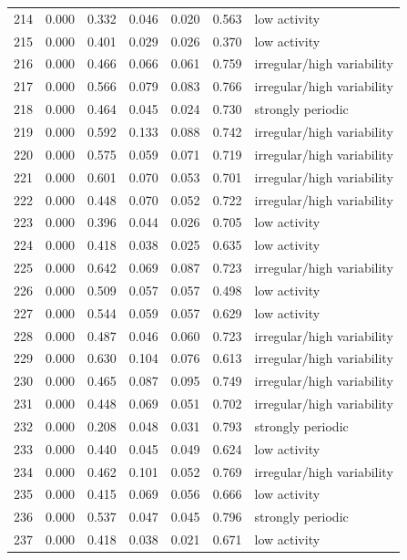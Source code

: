 \begin{longtable}{lrrrrrl}
214 & 0.000 & 0.332 & 0.046 & 0.020 & 0.563 & low activity \\
215 & 0.000 & 0.401 & 0.029 & 0.026 & 0.370 & low activity \\
216 & 0.000 & 0.466 & 0.066 & 0.061 & 0.759 & irregular/high variability \\
217 & 0.000 & 0.566 & 0.079 & 0.083 & 0.766 & irregular/high variability \\
218 & 0.000 & 0.464 & 0.045 & 0.024 & 0.730 & strongly periodic \\
219 & 0.000 & 0.592 & 0.133 & 0.088 & 0.742 & irregular/high variability \\
220 & 0.000 & 0.575 & 0.059 & 0.071 & 0.719 & irregular/high variability \\
221 & 0.000 & 0.601 & 0.070 & 0.053 & 0.701 & irregular/high variability \\
222 & 0.000 & 0.448 & 0.070 & 0.052 & 0.722 & irregular/high variability \\
223 & 0.000 & 0.396 & 0.044 & 0.026 & 0.705 & low activity \\
224 & 0.000 & 0.418 & 0.038 & 0.025 & 0.635 & low activity \\
225 & 0.000 & 0.642 & 0.069 & 0.087 & 0.723 & irregular/high variability \\
226 & 0.000 & 0.509 & 0.057 & 0.057 & 0.498 & low activity \\
227 & 0.000 & 0.544 & 0.059 & 0.057 & 0.629 & low activity \\
228 & 0.000 & 0.487 & 0.046 & 0.060 & 0.723 & irregular/high variability \\
229 & 0.000 & 0.630 & 0.104 & 0.076 & 0.613 & irregular/high variability \\
230 & 0.000 & 0.465 & 0.087 & 0.095 & 0.749 & irregular/high variability \\
231 & 0.000 & 0.448 & 0.069 & 0.051 & 0.702 & irregular/high variability \\
232 & 0.000 & 0.208 & 0.048 & 0.031 & 0.793 & strongly periodic \\
233 & 0.000 & 0.440 & 0.045 & 0.049 & 0.624 & low activity \\
234 & 0.000 & 0.462 & 0.101 & 0.052 & 0.769 & irregular/high variability \\
235 & 0.000 & 0.415 & 0.069 & 0.056 & 0.666 & low activity \\
236 & 0.000 & 0.537 & 0.047 & 0.045 & 0.796 & strongly periodic \\
237 & 0.000 & 0.418 & 0.038 & 0.021 & 0.671 & low activity \\

\end{longtable}
